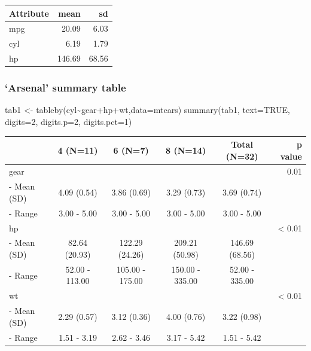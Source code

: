\documentclass[
]{article}
\newenvironment{Shaded}{\begin{snugshade}}{\end{snugshade}}
\newcommand{\AttributeTok}[1]{\textcolor[rgb]{0.77,0.63,0.00}{#1}}
\newcommand{\ConstantTok}[1]{\textcolor[rgb]{0.00,0.00,0.00}{#1}}
\newcommand{\DecValTok}[1]{\textcolor[rgb]{0.00,0.00,0.81}{#1}}
\newcommand{\FunctionTok}[1]{\textcolor[rgb]{0.00,0.00,0.00}{#1}}
\newcommand{\NormalTok}[1]{#1}
\newcommand{\OtherTok}[1]{\textcolor[rgb]{0.56,0.35,0.01}{#1}}
\newcommand{\SpecialCharTok}[1]{\textcolor[rgb]{0.00,0.00,0.00}{#1}}
\begin{document}
\begin{table}
\centering
\begin{tabular}{l|r|r}
\hline
Attribute & mean & sd\\
\hline
mpg & 20.09 & 6.03\\
\hline
cyl & 6.19 & 1.79\\
\hline
hp & 146.69 & 68.56\\
\hline
\end{tabular}
\end{table}

\hypertarget{arsenal-summary-table}{%
\subsubsection{`Arsenal' summary table}\label{arsenal-summary-table}}

\begin{Shaded}
\begin{Highlighting}[]
\NormalTok{tab1 }\OtherTok{\textless{}{-}} \FunctionTok{tableby}\NormalTok{(cyl}\SpecialCharTok{\textasciitilde{}}\NormalTok{gear}\SpecialCharTok{+}\NormalTok{hp}\SpecialCharTok{+}\NormalTok{wt,}\AttributeTok{data=}\NormalTok{mtcars)}
\FunctionTok{summary}\NormalTok{(tab1, }\AttributeTok{text=}\ConstantTok{TRUE}\NormalTok{, }\AttributeTok{digits=}\DecValTok{2}\NormalTok{, }\AttributeTok{digits.p=}\DecValTok{2}\NormalTok{, }\AttributeTok{digits.pct=}\DecValTok{1}\NormalTok{)}
\end{Highlighting}
\end{Shaded}

\begin{longtable}[]{@{}lccccr@{}}
\toprule
& 4 (N=11) & 6 (N=7) & 8 (N=14) & Total (N=32) & p value \\
\midrule
\endhead
gear & & & & & 0.01 \\
- Mean (SD) & 4.09 (0.54) & 3.86 (0.69) & 3.29 (0.73) & 3.69 (0.74) & \\
- Range & 3.00 - 5.00 & 3.00 - 5.00 & 3.00 - 5.00 & 3.00 - 5.00 & \\
hp & & & & & \textless{} 0.01 \\
- Mean (SD) & 82.64 (20.93) & 122.29 (24.26) & 209.21 (50.98) & 146.69 (68.56) & \\
- Range & 52.00 - 113.00 & 105.00 - 175.00 & 150.00 - 335.00 & 52.00 - 335.00 & \\
wt & & & & & \textless{} 0.01 \\
- Mean (SD) & 2.29 (0.57) & 3.12 (0.36) & 4.00 (0.76) & 3.22 (0.98) & \\
- Range & 1.51 - 3.19 & 2.62 - 3.46 & 3.17 - 5.42 & 1.51 - 5.42 & \\
\bottomrule
\end{longtable}
\end{document}
